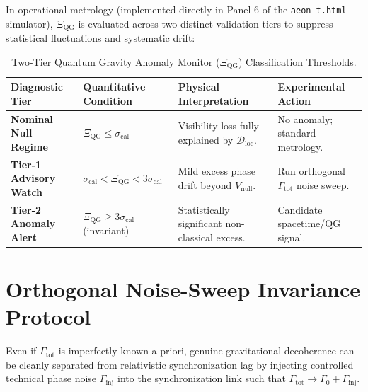 \documentclass[11pt,a4paper]{article}
\begin{document}
In operational metrology (implemented directly in Panel 6 of the \texttt{aeon-t.html} simulator), $\Xi_{\mathrm{QG}}$ is evaluated across two distinct validation tiers to suppress statistical fluctuations and systematic drift:

\begin{table}[h!]
\centering
\caption{Two-Tier Quantum Gravity Anomaly Monitor ($\Xi_{\mathrm{QG}}$) Classification Thresholds.}
\label{tab:xi_tiers}
\vspace{0.5em}
\begin{tabular}{@{}llll@{}}
\toprule
\textbf{Diagnostic Tier} & \textbf{Quantitative Condition} & \textbf{Physical Interpretation} & \textbf{Experimental Action} \\ \midrule
\textbf{Nominal Null Regime} & $\Xi_{\mathrm{QG}} \le \sigma_{\mathrm{cal}}$ & Visibility loss fully explained by $\mathcal{D}_{\mathrm{loc}}$. & No anomaly; standard metrology. \\
\textbf{Tier-1 Advisory Watch} & $\sigma_{\mathrm{cal}} < \Xi_{\mathrm{QG}} < 3\sigma_{\mathrm{cal}}$ & Mild excess phase drift beyond $V_{\mathrm{null}}$. & Run orthogonal $\Gamma_{\mathrm{tot}}$ noise sweep. \\
\textbf{Tier-2 Anomaly Alert} & $\Xi_{\mathrm{QG}} \ge 3\sigma_{\mathrm{cal}}$ (invariant) & Statistically significant non-classical excess. & Candidate spacetime/QG signal. \\ \bottomrule
\end{tabular}
\end{table}

\section{Orthogonal Noise-Sweep Invariance Protocol}

Even if $\Gamma_{\mathrm{tot}}$ is imperfectly known a priori, genuine gravitational decoherence can be cleanly separated from relativistic synchronization lag by injecting controlled technical phase noise $\Gamma_{\mathrm{inj}}$ into the synchronization link such that $\Gamma_{\mathrm{tot}} \to \Gamma_{0} + \Gamma_{\mathrm{inj}}$.
\end{document}
